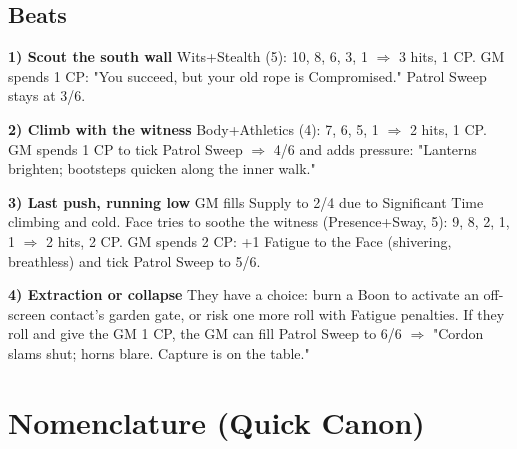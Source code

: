 \subsection{Beats}

\textbf{1) Scout the south wall} Wits+Stealth (5): 10, 8, 6, 3, 1 $\Rightarrow$ 3 hits, 1 CP. GM spends 1 CP: "You succeed, but your old rope is Compromised." Patrol Sweep stays at 3/6.

\textbf{2) Climb with the witness} Body+Athletics (4): 7, 6, 5, 1 $\Rightarrow$ 2 hits, 1 CP. GM spends 1 CP to tick Patrol Sweep $\Rightarrow$ 4/6 and adds pressure: "Lanterns brighten; bootsteps quicken along the inner walk."

\textbf{3) Last push, running low} GM fills Supply to 2/4 due to Significant Time climbing and cold. Face tries to soothe the witness (Presence+Sway, 5): 9, 8, 2, 1, 1 $\Rightarrow$ 2 hits, 2 CP. GM spends 2 CP: +1 Fatigue to the Face (shivering, breathless) and tick Patrol Sweep to 5/6.

\textbf{4) Extraction or collapse} They have a choice: burn a Boon to activate an off-screen contact's garden gate, or risk one more roll with Fatigue penalties. If they roll and give the GM 1 CP, the GM can fill Patrol Sweep to 6/6 $\Rightarrow$ "Cordon slams shut; horns blare. Capture is on the table."

\section{Nomenclature (Quick Canon)}

